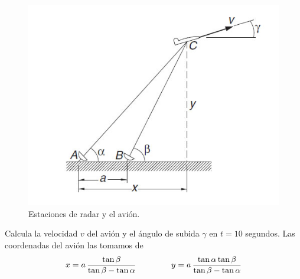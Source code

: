 \begin{enumerate}
\begin{figure}[H]
	\centering
	\includegraphics[scale=0.6]{Imagenes/ExamenFinal02_01.jpg} 
	\caption{Estaciones de radar y el avión.}
\end{figure}
Calcula la velocidad $v$ del avión y el ángulo de subida $\gamma$ en $t = 10$ segundos. Las coordenadas del avión las tomamos de
\[x = a \, \dfrac{\tan \beta}{\tan \beta - \tan \alpha} \hspace{1.5cm} y= a \, \dfrac{\tan \alpha \tan \beta}{\tan \beta - \tan \alpha}\]



\end{enumerate}
